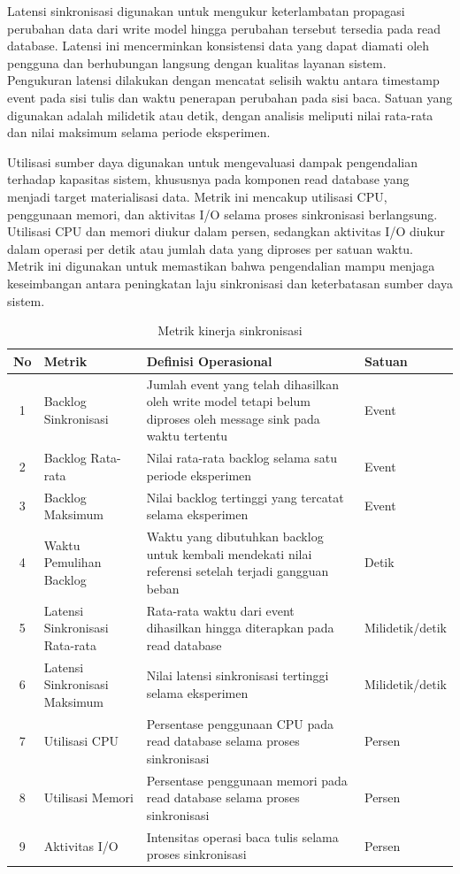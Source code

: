 Latensi sinkronisasi digunakan untuk mengukur keterlambatan propagasi perubahan data dari write model hingga perubahan tersebut tersedia pada read database.
Latensi ini mencerminkan konsistensi data yang dapat diamati oleh pengguna dan berhubungan langsung dengan kualitas layanan sistem.
Pengukuran latensi dilakukan dengan mencatat selisih waktu antara timestamp event pada sisi tulis dan waktu penerapan perubahan pada sisi baca.
Satuan yang digunakan adalah milidetik atau detik, dengan analisis meliputi nilai rata-rata dan nilai maksimum selama periode eksperimen.

Utilisasi sumber daya digunakan untuk mengevaluasi dampak pengendalian terhadap kapasitas sistem, khususnya pada komponen read database yang menjadi target materialisasi data.
Metrik ini mencakup utilisasi CPU, penggunaan memori, dan aktivitas I/O selama proses sinkronisasi berlangsung.
Utilisasi CPU dan memori diukur dalam persen, sedangkan aktivitas I/O diukur dalam operasi per detik atau jumlah data yang diproses per satuan waktu.
Metrik ini digunakan untuk memastikan bahwa pengendalian mampu menjaga keseimbangan antara peningkatan laju sinkronisasi dan keterbatasan sumber daya sistem.

\begin{table}[H]
    \centering
    \caption{Metrik kinerja sinkronisasi}
    \label{tab:metrik-sinkronisasi}
    \renewcommand{\arraystretch}{1.4}
    \begin{tabular}{|c|p{3cm}|p{6cm}|p{2.5cm}|}
    \hline
    \textbf{No} & \textbf{Metrik} & \textbf{Definisi Operasional} & \textbf{Satuan} \\
    \hline
    1 & Backlog Sinkronisasi & Jumlah event yang telah dihasilkan oleh write model tetapi belum diproses oleh message sink pada waktu tertentu & Event \\
    \hline
    2 & Backlog Rata-rata & Nilai rata-rata backlog selama satu periode eksperimen & Event \\
    \hline
    3 & Backlog Maksimum & Nilai backlog tertinggi yang tercatat selama eksperimen & Event \\
    \hline
    4 & Waktu Pemulihan Backlog & Waktu yang dibutuhkan backlog untuk kembali mendekati nilai referensi setelah terjadi gangguan beban & Detik \\
    \hline
    5 & Latensi Sinkronisasi Rata-rata & Rata-rata waktu dari event dihasilkan hingga diterapkan pada read database & Milidetik/detik \\
    \hline
    6 & Latensi Sinkronisasi Maksimum & Nilai latensi sinkronisasi tertinggi selama eksperimen & Milidetik/detik \\
    \hline
    7 & Utilisasi CPU & Persentase penggunaan CPU pada read database selama proses sinkronisasi & Persen \\
    \hline
    8 & Utilisasi Memori & Persentase penggunaan memori pada read database selama proses sinkronisasi & Persen \\
    \hline
    9 & Aktivitas I/O & Intensitas operasi baca tulis selama proses sinkronisasi & Persen \\
    \hline
    \end{tabular}
\end{table}

